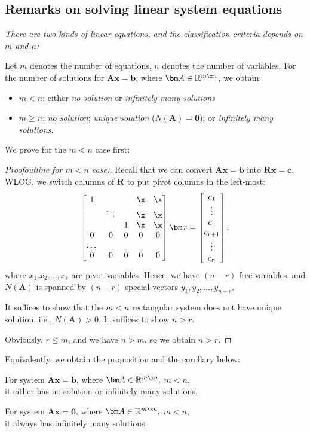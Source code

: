 \subsection{Remarks on solving linear system equations}
\emph{
There are two kinds of linear equations, and the classification criteria depends on $m$ and $n$:
}
\begin{theorem}
Let $m$ denotes the number of equations, $n$ denotes the number of variables. For the number of solutions for $\bm{Ax} = \bm b$, where $\bm A\in\mathbb{R}^{m\x n}$, we obtain:
\begin{itemize}
\item
$m<n$: either \emph{no solution} or \emph{infinitely many solutions}
\item
$m\ge n$: \emph{no solution}; \emph{unique solution} ($N(\bm A) =\bm 0$); or \emph{infinitely many solutions}.
\end{itemize}
\end{theorem}
We prove for the $m<n$ case first:
\begin{proof}[Proofoutline for $m<n$ case:]
Recall that we can convert $\bm{Ax} = \bm b$ into $\bm{Rx} = \bm{c}$. WLOG, we switch columns of $\bm R$ to put pivot columns in the left-most:
\[
\begin{bmatrix}
1&&&\x&\x\\&\ddots&&\x&\x\\&&1&\x&\x\\0&0&0&0&0\\\dots&&&&\\0&0&0&0&0
\end{bmatrix}\bm x = \begin{bmatrix}
c_1\\\vdots\\c_r\\c_{r+1}\\\vdots\\c_n
\end{bmatrix},
\]
where $x_1.x_2.\dots,x_r$ are pivot variables. Hence, we have $(n-r)$ free variables, and $N(\bm A)$ is spanned by $(n-r)$ special vectors $y_1,y_2,\dots,y_{n-r}$.

It suffices to show that the $m<n$ rectangular system does not have unique solution, i.e., $N(\bm A)>0$. It suffices to show $n>r$.

Obviously, $r\le m$, and we have $n>m$, so we obtain $n>r$.
\end{proof}
Equivalently, we obtain the proposition and the corollary below:
\begin{proposition}
For system $\bm{Ax} = \bm b$, where $\bm A\in\mathbb{R}^{m\x n},$ $m<n$,\\
it either has no solution or infinitely many solutions.
\end{proposition}
\begin{corollary}\label{corollary_infinite_condition}
For system $\bm{Ax} = \bm 0$, where $\bm A\in\mathbb{R}^{m\x n},$ $m<n$,\\
\hspace*{1cm} it always has infinitely many solutions.
\end{corollary}

